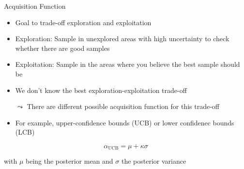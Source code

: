 \documentclass[aspectratio=169]{../latex_main/tntbeamer}  %
\begin{document}
\begin{frame}[c]{Acquisition Function}

\begin{itemize}
    \item Goal to trade-off exploration and exploitation
    \item \alert{Exploration:} Sample in unexplored areas with high uncertainty to check whether there are good samples
    \item \alert{Exploitation:} Sample in the areas where you believe the best sample should be
    \smallskip
    \item We don't know the best exploration-exploitation trade-off
    \item[$\leadsto$] There are different possible acquisition function for this trade-off
    \smallskip
    \item For example, upper-confidence bounds (UCB) or lower confidenec bounds (LCB)
\end{itemize}

\begin{equation}
    \alpha_{\text{UCB}} = \mu + \kappa \sigma
\end{equation}

with $\mu$ being the posterior mean and $\sigma$ the posterior variance

\end{frame}

\end{document}
